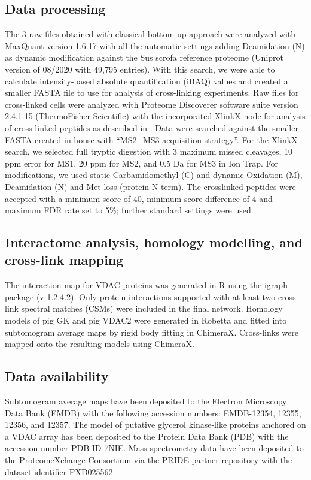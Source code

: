 \subsection*{Data processing}
The 3 raw files obtained with classical bottom-up approach were analyzed with Max\-Quant version 1.6.17 with all the automatic settings adding Deamidation (N) as dynamic modification against the Sus scrofa reference proteome (Uniprot version of 08/2020 with 49,795 entries). With this search, we were able to calculate intensity-based absolute quantification (iBAQ) values and created a smaller FASTA file to use for analysis of cross-linking experiments. Raw files for cross-linked cells were analyzed with Proteome Discoverer software suite version 2.4.1.15 (ThermoFisher Scientific) with the incorporated XlinkX node for analysis of cross-linked peptides as described in \cite{Klykov2018}. Data were searched against the smaller FASTA created in house with “MS2\_MS3 acquisition strategy”. For the XlinkX search, we selected full tryptic digestion with 3 maximum missed cleavages, 10 ppm error for MS1, 20 ppm for MS2, and 0.5 Da for MS3 in Ion Trap. For modifications, we used static Carbamidomethyl (C) and dynamic Oxidation (M), Deamidation (N) and Met-loss (protein N-term). The crosslinked peptides were accepted with a minimum score of 40, minimum score difference of 4 and maximum FDR rate set to 5\%; further standard settings were used.
%
\subsection*{Interactome analysis, homology modelling, and cross-link mapping}
The interaction map for VDAC proteins was generated in R \cite{Grant2006} using the igraph package (v 1.2.4.2). Only protein interactions supported with at least two cross-link spectral matches (CSMs) were included in the final network. Homology models of pig GK and pig VDAC2 were generated in Robetta \cite{Kim2004} and fitted into subtomogram average maps by rigid body fitting in ChimeraX. Cross-links were mapped onto the resulting models using ChimeraX.
%
\subsection*{Data availability}
Subtomogram average maps have been deposited to the Electron Microscopy Data Bank (EMDB) with the following accession numbers: EMDB-12354, 12355, 12356, and 12357. The model of putative glycerol kinase-like proteins anchored on a VDAC array has been deposited to the Protein Data Bank (PDB) with the accession number PDB ID 7NIE. Mass spectrometry data have been deposited to the ProteomeXchange Consortium via the PRIDE partner repository with the dataset identifier PXD025562.
%
